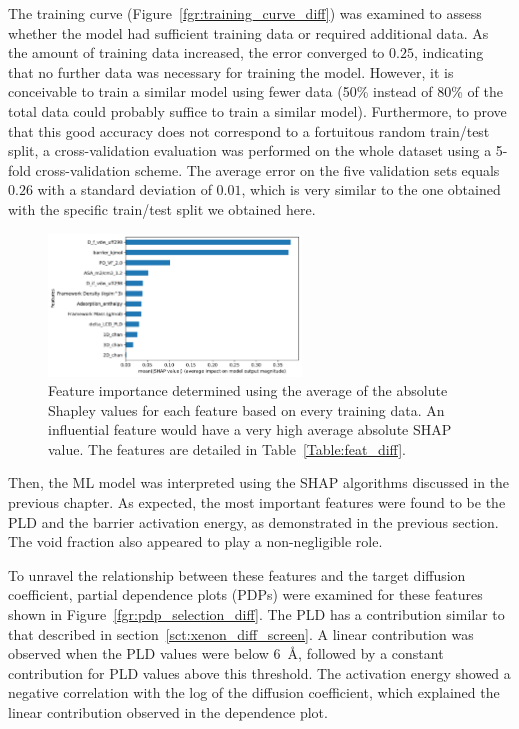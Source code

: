 \documentclass[main]{subfiles}
\begin{document}
The training curve (Figure~\ref{fgr:training_curve_diff}) was examined to assess whether the model had sufficient training data or required additional data. As the amount of training data increased, the error converged to $0.25$, indicating that no further data was necessary for training the model. However, it is conceivable to train a similar model using fewer data (50\% instead of 80\% of the total data could probably suffice to train a similar model). Furthermore, to prove that this good accuracy does not correspond to a fortuitous random train/test split, a cross-validation evaluation was performed on the whole dataset using a 5-fold cross-validation scheme. The average error on the five validation sets equals $0.26$ with a standard deviation of $0.01$, which is very similar to the one obtained with the specific train/test split we obtained here.

\begin{figure}[ht]
  \centering
  \includegraphics[width=0.6\textwidth]{figures/5-diffusion/Diff_Feature_importance_shapbased.pdf}
  \caption{ Feature importance determined using the average of the absolute Shapley values for each feature based on every training data. An influential feature would have a very high average absolute SHAP value. The features are detailed in Table~\ref{Table:feat_diff}. }\label{fgr:feat_imp_diff}
\end{figure}

Then, the ML model was interpreted using the SHAP algorithms discussed in the previous chapter. As expected, the most important features were found to be the PLD and the barrier activation energy, as demonstrated in the previous section. The void fraction also appeared to play a non-negligible role.

To unravel the relationship between these features and the target diffusion coefficient, partial dependence plots (PDPs) were examined for these features shown in Figure~\ref{fgr:pdp_selection_diff}. 
The PLD has a contribution similar to that described in section~\ref{sct:xenon_diff_screen}. A linear contribution was observed when the PLD values were below \SI{6}{\angstrom}, followed by a constant contribution for PLD values above this threshold. The activation energy showed a negative correlation with the log of the diffusion coefficient, which explained the linear contribution observed in the dependence plot.
\end{document}
